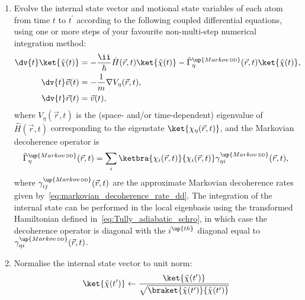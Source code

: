 \begin{enumerate}
    \item Evolve the internal state vector and motional state variables of each atom from time $t$ to $t^\prime$ according to the following coupled differential equations, using one or more steps of your favourite non-multi-step numerical integration method:
    \begin{align}
    \dv{t}\ket{\tilde\chi(t)} &= -\frac\ii\hbar \hat H(\vec r, t)\ket{\tilde\chi(t)} - \hat\Gamma^\up{Markov\,\textsc{dd}}_\eta(\vec r, t)\ket{\tilde\chi(t)},\\
    \dv{t}\vec v(t) &= -\frac1m\nabla V_\eta(\vec r, t),\\
    \dv{t}\vec r(t) &= \vec v(t),
    \end{align}
    where $V_\eta(\vec r, t)$ is the (space- and/or time-dependent) eigenvalue of $\hat H(\vec r, t)$ corresponding to the eigenstate $\ket{\chi_\eta(\vec r, t)}$, and the Markovian decoherence operator is
    \begin{align}
    \hat\Gamma^\up{Markov\,\textsc{dd}}_\eta(\vec r, t) = \sum_i\ketbra{\chi_i(\vec r, t)}{\chi_i(\vec r, t)}\gamma^\up{Markov\,\textsc{dd}}_{\eta i}(\vec r, t),
    \end{align}
    where $\gamma^\up{Markov\,\textsc{dd}}_{ij}(\vec r, t)$ are the approximate Markovian decoherence rates given by~\eqref{eq:markovian_decoherence_rate_dd}. The integration of the internal state can be performed in the local eigenbasis using the transformed Hamiltonian defined in~\eqref{eq:Tully_adiabatic_schro}, in which case the decoherence operator is diagonal with the $i^\up{th}$ diagonal equal to $\gamma^\up{Markov\,\textsc{dd}}_{\eta i}(\vec r, t)$.

    \item Normalise the internal state vector to unit norm:
    \begin{align}
    \ket{\tilde\chi(t^\prime)} \leftarrow \frac{\ket{\tilde\chi(t^\prime)}}
                               {\sqrt{\braket{\tilde\chi(t^\prime)}{\tilde\chi(t^\prime)}}}
    \end{align}


\end{enumerate}
